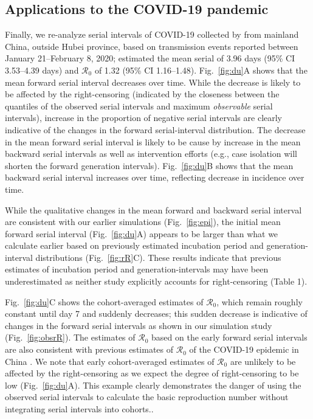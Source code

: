 \documentclass[12pt]{article}
\newcommand{\fref}[1]{Fig.~\ref{fig:#1}}
\newcommand{\Rx}[1]{\ensuremath{{\mathcal R}_{#1}}\xspace}
\newcommand{\Ro}{\Rx{0}}
\begin{document}
\subsection{Applications to the COVID-19 pandemic}

Finally, we re-analyze serial intervals of COVID-19 collected by \cite{du2020serial} from mainland China, outside Hubei province, based on transmission events reported between January 21--February 8, 2020;
\cite{du2020serial} estimated the mean serial of 3.96 days (95\% CI 3.53–4.39 days) and \Ro of 1.32 (95\% CI 1.16–1.48).
\fref{du}A shows that the mean forward serial interval decreases over time.
While the decrease is likely to be affected by the right-censoring (indicated by the closeness between the quantiles of the observed serial intervals and maximum \emph{observable} serial intervals), increase in the proportion of negative serial intervals are clearly indicative of the changes in the forward serial-interval distribution.
The decrease in the mean forward serial interval is likely to be cause by increase in the mean backward serial intervals as well as intervention efforts (e.g., case isolation will shorten the forward generation intervals).
\fref{du}B shows that the mean backward serial interval increases over time, reflecting decrease in incidence over time.

While the qualitative changes in the mean forward and backward serial interval are consistent with our earlier simulations (\fref{epi}), the initial mean forward serial interval (\fref{du}A) appears to be larger than what we calculate earlier based on previously estimated incubation period and generation-interval distributions (\fref{rR}C).
These results indicate that previous estimates of incubation period and generation-intervals may have been underestimated as neither study explicitly accounts for right-censoring (Table 1).

\fref{du}C shows the cohort-averaged estimates of \Ro, which remain roughly constant until day 7 and suddenly decreases;
this sudden decrease is indicative of changes in the forward serial intervals as shown in our simulation study (\fref{obsrR}).
The estimates of \Ro based on the early forward serial intervals are also consistent with previous estimates of \Ro of the COVID-19 epidemic in China \citep{majumder2020early, park2020reconciling}.
We note that early cohort-averaged estimates of \Ro are unlikely to be affected by the right-censoring as we expect the degree of right-censoring to be low (\fref{du}A).
This example clearly demonstrates the danger of using the observed serial intervals to calculate the basic reproduction number without integrating serial intervals into cohorts..
\end{document}
